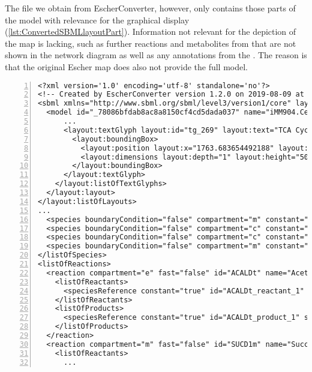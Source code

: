 The \SBML file we obtain from EscherConverter, however, only contains those parts of the model with relevance for the graphical display (\cref{lst:ConvertedSBMLlayoutPart}).
Information not relevant for the depiction of the map is lacking, such as further reactions and metabolites from \iMM that are not shown in the network diagram as well as any \MIRIAM annotations \citep{Juty2012} from the \GEM.
The reason is that the original Escher map does also not provide the full model.
\begin{lstlisting}[language=SBML,numbers=left,captionpos=t,float=p,caption={Extract from the converted \SBML layout file for \iMM},label={lst:ConvertedSBMLlayoutPart}]
<?xml version='1.0' encoding='utf-8' standalone='no'?>
<!-- Created by EscherConverter version 1.2.0 on 2019-08-09 at 14:15:08 MESZ with JSBML version 1.4. -->
<sbml xmlns="http://www.sbml.org/sbml/level3/version1/core" layout:required="false" level="3" version="1" xmlns:layout="http://www.sbml.org/sbml/level3/version1/layout/version1">
  <model id="_78086bfdab8ac8a8150cf4cd5dada037" name="iMM904.Central carbon metabolism">
      ...
      <layout:textGlyph layout:id="tg_269" layout:text="TCA Cycle">
        <layout:boundingBox>
          <layout:position layout:x="1763.683654492188" layout:y="5946.125330570312" layout:z="0"/>
          <layout:dimensions layout:depth="1" layout:height="50" layout:width="160"/>
        </layout:boundingBox>
      </layout:textGlyph>
    </layout:listOfTextGlyphs>
  </layout:layout>
</layout:listOfLayouts>
...
  <species boundaryCondition="false" compartment="m" constant="false" hasOnlySubstanceUnits="true" id="ac_m" name="Acetate" sboTerm="SBO:0000247"/>
  <species boundaryCondition="false" compartment="c" constant="false" hasOnlySubstanceUnits="true" id="ac_c" name="Acetate" sboTerm="SBO:0000247"/>
  <species boundaryCondition="false" compartment="c" constant="false" hasOnlySubstanceUnits="true" id="g6p_c" name="D-Glucose 6-phosphate" sboTerm="SBO:0000247"/>
  <species boundaryCondition="false" compartment="m" constant="false" hasOnlySubstanceUnits="true" id="fadh2_m" name="Flavin adenine dinucleotide reduced" sboTerm="SBO:0000247"/>
</listOfSpecies>
<listOfReactions>
  <reaction compartment="e" fast="false" id="ACALDt" name="Acetaldehyde reversible transport" reversible="true" sboTerm="SBO:0000375">
    <listOfReactants>
      <speciesReference constant="true" id="ACALDt_reactant_1" sboTerm="SBO:0000010" species="acald_e" stoichiometry="1"/>
    </listOfReactants>
    <listOfProducts>
      <speciesReference constant="true" id="ACALDt_product_1" species="acald_c" stoichiometry="1"/>
    </listOfProducts>
  </reaction>
  <reaction compartment="m" fast="false" id="SUCD1m" name="Succinate dehydrogenase" reversible="true" sboTerm="SBO:0000375">
    <listOfReactants>
      ...
\end{lstlisting}

